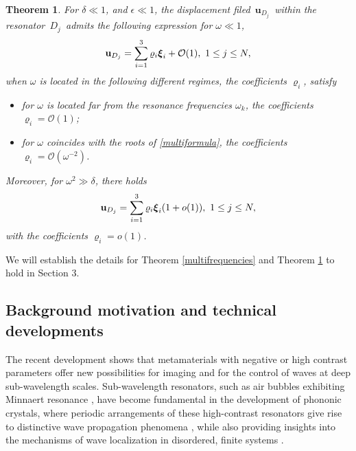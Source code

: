 \documentclass[10pt,reqno,oneside]{amsart}%
\newtheorem{thm}{Theorem}[section]
\theoremstyle{definition}
\theoremstyle{remark}
\numberwithin{equation}{section}
\numberwithin{equation}{section}
\begin{document}
\begin{thm}\label{pointscattererapproximation}
For $\delta\ll 1$, and $\epsilon\ll 1$, the displacement filed~$\mathbf{u}_{{D}_j}$~within the resonator~${D}_j$~admits the following expression for $\omega\ll1$,
\vspace{-7pt}%
$$
\mathbf{u}_{{D}_j}=\sum_{i=1}^3\varrho_i \boldsymbol{\xi}_i+\mathcal{O}(1),\ 1\leq j\leq N,
\vspace{-2pt}
$$
when $\omega$ is located in the following different regimes, the coefficients $\varrho_i$, satisfy
\vspace{1pt}
\begin{itemize}
\item[(i)] for $\omega$ is located far from the resonance frequencies $\omega_k$, the coefficients $\varrho_i=\mathcal{O}(1)$;
\vspace{2pt}
\item[(ii)] for $\omega$ coincides with the roots of \eqref{multiformula}, the coefficients $\varrho_i=\mathcal{O}(\omega^{-2})$.
\end{itemize}
Moreover, for $\omega^2\gg \delta$, there holds
\vspace{-7pt}
$$
{\mathbf{u}_{{D}_j}=\sum_{i=1}^3\varrho_i \boldsymbol{\xi}_i(1+{o}(1))}, \ 1\leq j\leq N,
\vspace{-2pt}
$$
with the coefficients $\varrho_i=o(1)$.
\end{thm}
We will establish the details for Theorem \ref{multifrequencies} and Theorem \ref{pointscattererapproximation} to hold in Section 3.
\subsection{Background motivation and technical developments}The recent development shows that metamaterials with negative or high contrast parameters offer new possibilities for imaging and for the control of waves at deep sub-wavelength scales. Sub-wavelength resonators, such as air bubbles exhibiting Minnaert resonance \cite{1933Minnaert,Minnaertresonances}, have become fundamental in the development of phononic crystals, where periodic arrangements of these high-contrast resonators give rise to distinctive wave propagation phenomena \cite{Pendry,bandgapopening,phononiccrystals}, while also providing insights into the mechanisms of wave localization in disordered, finite systems \cite{skineffect1,defect1,Robustedge,DisorderedSystems}.
\end{document}
